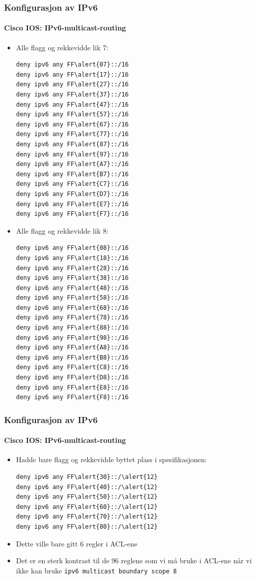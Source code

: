 \begin{frame}[fragile]%
  \frametitle{Konfigurasjon av IPv6}
  \framesubtitle{Cisco IOS: IPv6-multicast-routing}
  \begin{multicols}{2}
    \begin{itemize}%
    \item Alle flagg og rekkevidde lik 7:
\begin{Verbatim}[commandchars=\\\{\},fontsize=\scriptsize]
deny ipv6 any FF\alert{07}::/16
deny ipv6 any FF\alert{17}::/16
deny ipv6 any FF\alert{27}::/16
deny ipv6 any FF\alert{37}::/16
deny ipv6 any FF\alert{47}::/16
deny ipv6 any FF\alert{57}::/16
deny ipv6 any FF\alert{67}::/16
deny ipv6 any FF\alert{77}::/16
deny ipv6 any FF\alert{87}::/16
deny ipv6 any FF\alert{97}::/16
deny ipv6 any FF\alert{A7}::/16
deny ipv6 any FF\alert{B7}::/16
deny ipv6 any FF\alert{C7}::/16
deny ipv6 any FF\alert{D7}::/16
deny ipv6 any FF\alert{E7}::/16
deny ipv6 any FF\alert{F7}::/16
\end{Verbatim}
    \item Alle flagg og rekkevidde lik 8:
\begin{Verbatim}[commandchars=\\\{\},fontsize=\scriptsize]
deny ipv6 any FF\alert{08}::/16
deny ipv6 any FF\alert{18}::/16
deny ipv6 any FF\alert{28}::/16
deny ipv6 any FF\alert{38}::/16
deny ipv6 any FF\alert{48}::/16
deny ipv6 any FF\alert{58}::/16
deny ipv6 any FF\alert{68}::/16
deny ipv6 any FF\alert{78}::/16
deny ipv6 any FF\alert{88}::/16
deny ipv6 any FF\alert{98}::/16
deny ipv6 any FF\alert{A8}::/16
deny ipv6 any FF\alert{B8}::/16
deny ipv6 any FF\alert{C8}::/16
deny ipv6 any FF\alert{D8}::/16
deny ipv6 any FF\alert{E8}::/16
deny ipv6 any FF\alert{F8}::/16
\end{Verbatim}
    \end{itemize}
  \end{multicols}
\end{frame}

\begin{frame}[fragile]%
  \frametitle{Konfigurasjon av IPv6}
  \framesubtitle{Cisco IOS: IPv6-multicast-routing}
  \begin{itemize}%
    \item Hadde bare flagg og rekkevidde byttet plass i spesifikasjonen:
\begin{Verbatim}[commandchars=\\\{\}]
deny ipv6 any FF\alert{30}::/\alert{12}
deny ipv6 any FF\alert{40}::/\alert{12}
deny ipv6 any FF\alert{50}::/\alert{12}
deny ipv6 any FF\alert{60}::/\alert{12}
deny ipv6 any FF\alert{70}::/\alert{12}
deny ipv6 any FF\alert{80}::/\alert{12}
\end{Verbatim}
    \item Dette ville bare gitt 6 regler i ACL-ene
    \item Det er en sterk kontrast til de 96 reglene som vi må bruke i
      ACL-ene når vi ikke kan bruke \texttt{ipv6 multicast boundary
        scope 8}
  \end{itemize}
\end{frame}

